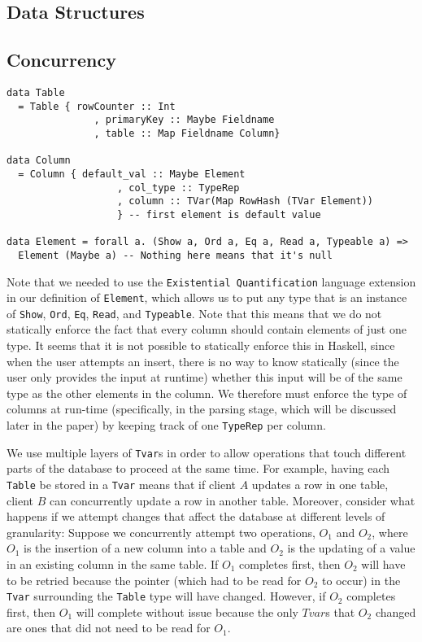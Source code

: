 \documentclass[10.75pt]{article}
\begin{document}
\begin{multicols}{2}
\section{Data Structures}

\subsection{Concurrency} 
\noindent\begin{minipage}{.45\textwidth}
\begin{lstlisting}[caption=code 1,frame=tlrb, breaklines=true]
data Table 
  = Table { rowCounter :: Int 
               , primaryKey :: Maybe Fieldname 
               , table :: Map Fieldname Column}

data Column 
  = Column { default_val :: Maybe Element
                   , col_type :: TypeRep
                   , column :: TVar(Map RowHash (TVar Element))
                   } -- first element is default value

data Element = forall a. (Show a, Ord a, Eq a, Read a, Typeable a) => 
  Element (Maybe a) -- Nothing here means that it's null
\end{lstlisting}
\end{minipage}\hfill

Note that we needed to use the \texttt{Existential Quantification} language extension in our definition of \texttt{Element}, which allows us to put any type that is an instance of \texttt{Show}, \texttt{Ord}, \texttt{Eq}, \texttt{Read}, and \texttt{Typeable}.  Note that this means that we do not statically enforce the fact that every column should contain elements of just one type. It seems that it is not possible to statically enforce this in Haskell, since when the user attempts an insert, there is no way to know statically (since the user only provides the input at runtime) whether this input will be of the same type as the other elements in the column. We therefore must enforce the type of columns at run-time (specifically, in the parsing stage, which will be discussed later in the paper) by keeping track of one \texttt{TypeRep} per column. 

We use multiple layers of \texttt{Tvar}s in order to allow operations that touch different parts of the database to proceed at the same time. For example, having each \texttt{Table} be stored in a \texttt{Tvar} means that if client $A$ updates a row in one table, client $B$ can concurrently update a row in another table. Moreover, consider what happens if we attempt changes that affect the database at different levels of granularity: Suppose we concurrently attempt two operations, $O_1$ and $O_2$, where $O_1$ is the insertion of a new column into a table and $O_2$ is the updating of a value in an existing column in the same table. If $O_1$ completes first, then $O_2$ will have to be retried because the pointer (which had to be read for $O_2$ to occur) in the \texttt{Tvar} surrounding the \texttt{Table} type will have changed. However, if $O_2$ completes first, then $O_1$ will complete without issue because the only $Tvar$s that $O_2$ changed are ones that did not need to be read for $O_1$. 



\end{multicols}
\end{document}
